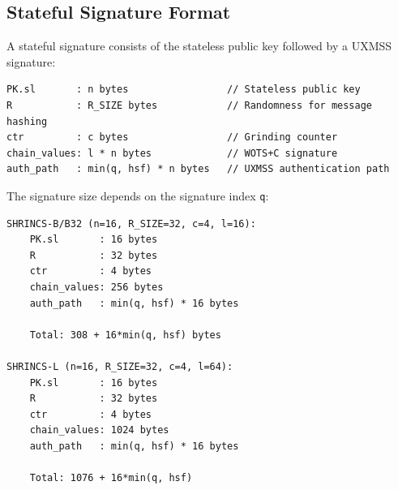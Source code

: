 \subsection{Stateful Signature Format}
A stateful signature consists of the stateless public key followed by a UXMSS signature:
\begin{verbatim}
PK.sl       : n bytes                 // Stateless public key
R           : R_SIZE bytes            // Randomness for message hashing  
ctr         : c bytes                 // Grinding counter
chain_values: l * n bytes             // WOTS+C signature
auth_path   : min(q, hsf) * n bytes   // UXMSS authentication path
\end{verbatim}
The signature size depends on the signature index \texttt{q}:
\begin{verbatim}
SHRINCS-B/B32 (n=16, R_SIZE=32, c=4, l=16):
    PK.sl       : 16 bytes
    R           : 32 bytes
    ctr         : 4 bytes
    chain_values: 256 bytes  
    auth_path   : min(q, hsf) * 16 bytes
  
    Total: 308 + 16*min(q, hsf) bytes

SHRINCS-L (n=16, R_SIZE=32, c=4, l=64):
    PK.sl       : 16 bytes
    R           : 32 bytes  
    ctr         : 4 bytes
    chain_values: 1024 bytes   
    auth_path   : min(q, hsf) * 16 bytes
  
    Total: 1076 + 16*min(q, hsf)
\end{verbatim}

